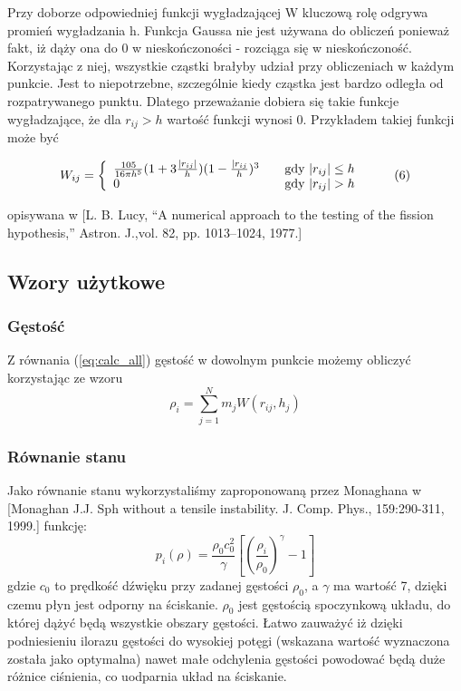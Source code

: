 \documentclass[polish, 12pt]{aghthesis}
\begin{document}
			Przy doborze odpowiedniej funkcji wygładzającej W kluczową rolę odgrywa promień wygładzania h. Funkcja Gaussa nie jest używana do obliczeń ponieważ fakt, iż dąży ona do 0 w nieskończoności - rozciąga się w nieskończoność. Korzystając z niej, wszystkie cząstki brałyby udział przy obliczeniach w każdym punkcie. Jest to niepotrzebne, szczególnie kiedy cząstka jest bardzo odległa od rozpatrywanego punktu. Dlatego przeważanie dobiera się takie funkcje wygładzające, że dla ${r_{ij} > h}$ wartość funkcji wynosi 0. Przykładem takiej funkcji może być 
			
			\[ W_{ij} = \left\{
				\begin{array}{l l}
					\frac{105}{16 \pi h^5}(1 + 3 \frac{|r_{ij}|}{h})(1-\frac{|r_{ij}}{h})^3 & \quad \text{gdy ${|r_{ij}| \leq h}$}  \\ 0 & \quad \text{gdy ${|r_{ij}| > h}$} 
				\end{array} \right.\ \label{eq:kernel_function} \tag{6}\]
			
			opisywana w [L. B. Lucy, “A numerical approach to the testing of the fission hypothesis,” Astron. J.,vol. 82, pp. 1013–1024, 1977.] 
			
		\subsection{Wzory użytkowe}
			\subsubsection{Gęstość}
			Z równania (\ref{eq:calc_all}) gęstość w dowolnym punkcie możemy obliczyć korzystając ze wzoru \[{\rho}_i=\sum_{j=1}^{N}m_jW(r_{ij},h_j) \label{eq:calc_density} \tag{7}\] 
			\subsubsection{Równanie stanu}
			Jako równanie stanu wykorzystaliśmy zaproponowaną przez Monaghana w [Monaghan J.J. Sph without a tensile instability. J. Comp. Phys., 159:290-311, 1999.] funkcję:
			\[p_i(\rho)=\frac{\rho_0 c_0^2}{\gamma}[(\frac{\rho_i}{\rho_0})^{\gamma} - 1] \label{eq:calc_state} \tag{8}\]
			gdzie ${c_0}$ to prędkość dźwięku przy zadanej gęstości ${\rho_0}$, a ${\gamma}$ ma wartość 7, dzięki czemu płyn jest odporny na ściskanie. $\rho_0$ jest gęstością spoczynkową układu, do której dążyć będą wszystkie obszary gęstości. Łatwo zauważyć iż dzięki podniesieniu ilorazu gęstości do wysokiej potęgi (wskazana wartość wyznaczona została jako optymalna) nawet małe odchylenia gęstości powodować będą duże różnice ciśnienia, co uodparnia układ na ściskanie.
			
\end{document}
